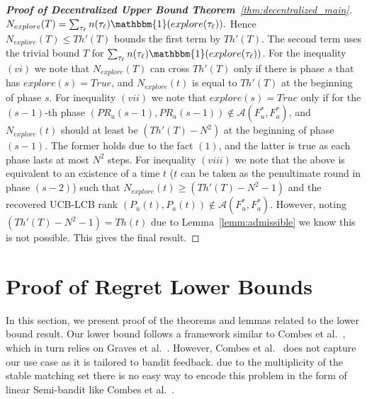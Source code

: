 \documentclass{article}
\begin{document}
\begin{proof}[\textbf{Proof of Decentralized Upper Bound Theorem}~\ref{thm:decentralized_main}]
$N_{explore}(T) = \sum_{\tau_{\ell}} n(\tau_{\ell})\mathbbm{1}(explore(\tau_{\ell})).$ Hence $N_{explore}(T) \leq Th'(T)$ bounds the first term by $Th'(T)$. The second term uses the trivial bound $T$ for $\sum_{\tau_{\ell}} n(\tau_{\ell})\mathbbm{1}(explore(\tau_{\ell}))$.
For the inequality $(vi)$ we note that $N_{explore}(T)$ can cross $Th'(T)$ only if there is phase $s$ that has $explore(s) = True$, and $N_{explore}(t)$ is equal to $Th'(T)$ at the beginning of phase $s$.
For inequality $(vii)$ we note that $explore(s) = True$ only if for the $(s-1)$-th phase $(PR_{u}(s - 1), PR_{a}(s - 1)) \notin \mathcal{A}(F^*_u, F^*_a)$, and  $N_{explore}(t)$ should at least be $(Th'(T) - N^2)$ at the beginning of phase $(s - 1)$. The former holds due to the fact $(1)$, and the latter is true as each phase lasts at most $N^2$ steps. For inequality $(viii)$ we note that the above is equivalent to an existence of a time $t$ ($t$ can be taken as the penultimate round in phase $(s-2)$) such that $N_{explore}(t) \geq  (Th'(T) - N^2 - 1)$ and the recovered UCB-LCB rank $(P_{u}(t), P_{a}(t)) \notin \mathcal{A}(F^*_u, F^*_a)$. However, noting $(Th'(T) - N^2 - 1) = Th(t)$ due to Lemma~\ref{lemm:admissible} we know this is not possible. This gives the final result. 
\end{proof}


\section{Proof of Regret Lower Bounds}\label{app:lower}
In this section, we present proof of the theorems and lemmas related to the lower bound result. Our lower bound follows a framework similar to Combes et al.~\cite{combes2017minimal}, which in turn relies on Graves et al.~\cite{graves1997asymptotically}.  However, Combes et al.~\cite{combes2017minimal} does not capture our use case as it is tailored to bandit feedback. due to the multiplicity of the stable matching set there is no easy way to encode this problem in the form of linear Semi-bandit like Combes et al.~\cite{combes2015combinatorial}. 
\end{document}
